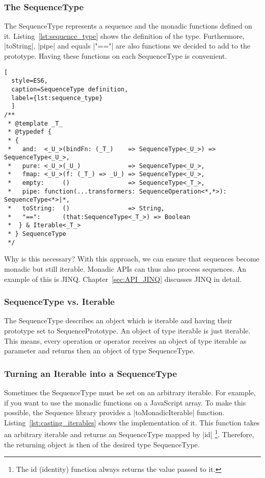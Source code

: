 \subsubsection{The SequenceType} %
\label{subsub:The SequenceType}

The SequenceType represents a sequence and the monadic functions defined on it. 
Listing~\ref{lst:sequence_type} shows the definition of the type.
Furthermore, |toString|, |pipe| and equals |"=="| are also functions we decided to add to the
prototype. Having these functions on each SequenceType is convenient.

\begin{lstlisting}[
  style=ES6, 
  caption=SequenceType definition,
  label={lst:sequence_type}
  ]
/**
 * @template _T_
 * @typedef {
 * {
 *   and:  <_U_>(bindFn: (_T_)    => SequenceType<_U_>) => SequenceType<_U_>,
 *   pure: <_U_>(_U_)             => SequenceType<_U_>,
 *   fmap: <_U_>(f: (_T_) => _U_) => SequenceType<_U_>,
 *   empty:     ()                => SequenceType<_T_>,
 *   pipe: function(...transformers: SequenceOperation<*,*>): SequenceType<*>|*,
 *   toString:  ()                => String,
 *   "==":      (that:SequenceType<_T_>) => Boolean
 *  } & Iterable<_T_>
 * } SequenceType
 */
\end{lstlisting}

Why is this necessary? With this approach, we can ensure that sequences become
monadic but still iterable. Monadic APIs can thus also process sequences. An
example of this is JINQ. Chapter~\ref{sec:API_JINQ} discusses JINQ in detail.

\subsubsection{SequenceType vs. Iterable} %
\label{subsub:SequenceType vs. Iterable}
The SequenceType describes an object which is iterable and having their
prototype set to SequencePrototype. An object of type iterable is just
iterable. This means, every operation or operator receives an object of type iterable as
parameter and returns then an object of type SequenceType.


\subsubsection{Turning an Iterable into a SequenceType}
\label{subsub:Turn Iterables into SequenceType}
Sometimes the SequenceType must be set on an arbitrary iterable. For example,
if you want to use the monadic functions on a JavaScript array. To make this
possible, the Sequence library provides a |toMonadicIterable| function.
Listing~\ref{lst:casting_iterables} shows the
implementation of it. This function takes an arbitrary iterable and returns an
SequenceType mapped by |id| \footnote{The id (identity) function always
returns the value passed to it.}. 
Therefore, the returning object is then of the desired type SequenceType.


